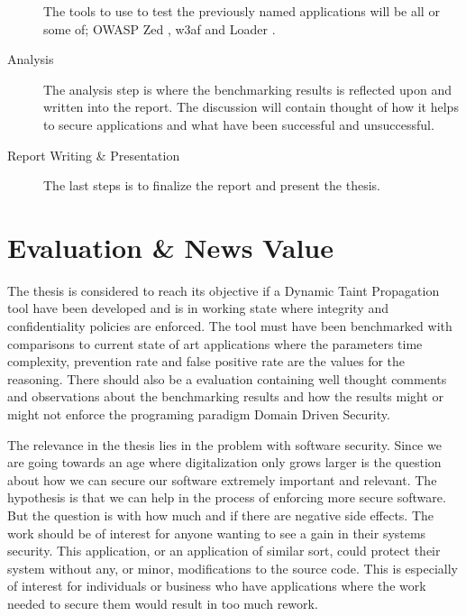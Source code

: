 \documentclass{../kththesis}
\begin{document}
\begin{description}
	The tools to use to test the previously named applications will be all or some of; OWASP Zed \parencite{zed}, w3af \parencite{w3af} and Loader \parencite{loader}.

	\item [Analysis]
	The analysis step is where the benchmarking results is reflected upon and written into the report. The discussion will contain thought of how it helps to secure applications and what have been successful and unsuccessful.

	\item [Report Writing \& Presentation]
	The last steps is to finalize the report and present the thesis.
\end{description}



\chapter{Evaluation \& News Value}
The thesis is considered to reach its objective if a Dynamic Taint Propagation tool have been developed and is in working state where integrity and confidentiality policies are enforced. The tool must have been benchmarked with comparisons to current state of art applications where the parameters time complexity, prevention rate and false positive rate are the values for the reasoning. There should also be a evaluation containing well thought comments and observations about the benchmarking results and how the results might or might not enforce the programing paradigm Domain Driven Security.

The relevance in the thesis lies in the problem with software security. Since we are going towards an age where digitalization only grows larger is the question about how we can secure our software extremely important and relevant. The hypothesis is that we can help in the process of enforcing more secure software. But the question is with how much and if there are negative side effects. The work should be of interest for anyone wanting to see a gain in their systems security. This application, or an application of similar sort, could protect their system without any, or minor, modifications to the source code. This is especially of interest for individuals or business who have applications where the work needed to secure them would result in too much rework.
\end{document}
